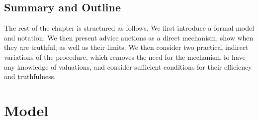 






\subsection{Summary and Outline}


The rest of the chapter is structured as follows.
We first introduce a formal model and notation.
We then present advice auctions as a direct mechanism, show when they are truthful, as well as their limits.
We then consider two practical indirect variations of the procedure, which removes the need for the mechanism to have any knowledge of valuations, and consider sufficient conditions for their efficiency and truthfulness.  



\section{Model}



